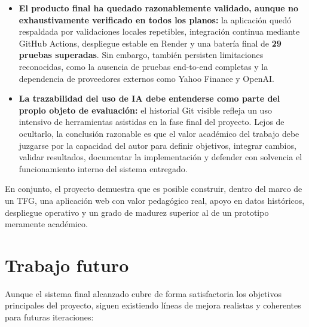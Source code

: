 \begin{itemize}
    \item \textbf{El producto final ha quedado razonablemente validado, aunque no exhaustivamente verificado en todos los planos:} la aplicación quedó respaldada por validaciones locales repetibles, integración continua mediante GitHub Actions, despliegue estable en Render y una batería final de \textbf{29 pruebas superadas}. Sin embargo, también persisten limitaciones reconocidas, como la ausencia de pruebas end-to-end completas y la dependencia de proveedores externos como Yahoo Finance y OpenAI.

    \item \textbf{La trazabilidad del uso de IA debe entenderse como parte del propio objeto de evaluación:} el historial Git visible refleja un uso intensivo de herramientas asistidas en la fase final del proyecto. Lejos de ocultarlo, la conclusión razonable es que el valor académico del trabajo debe juzgarse por la capacidad del autor para definir objetivos, integrar cambios, validar resultados, documentar la implementación y defender con solvencia el funcionamiento interno del sistema entregado.
\end{itemize}

En conjunto, el proyecto demuestra que es posible construir, dentro del marco de un TFG, una aplicación web con valor pedagógico real, apoyo en datos históricos, despliegue operativo y un grado de madurez superior al de un prototipo meramente académico.

\section{Trabajo futuro}

Aunque el sistema final alcanzado cubre de forma satisfactoria los objetivos principales del proyecto, siguen existiendo líneas de mejora realistas y coherentes para futuras iteraciones:

